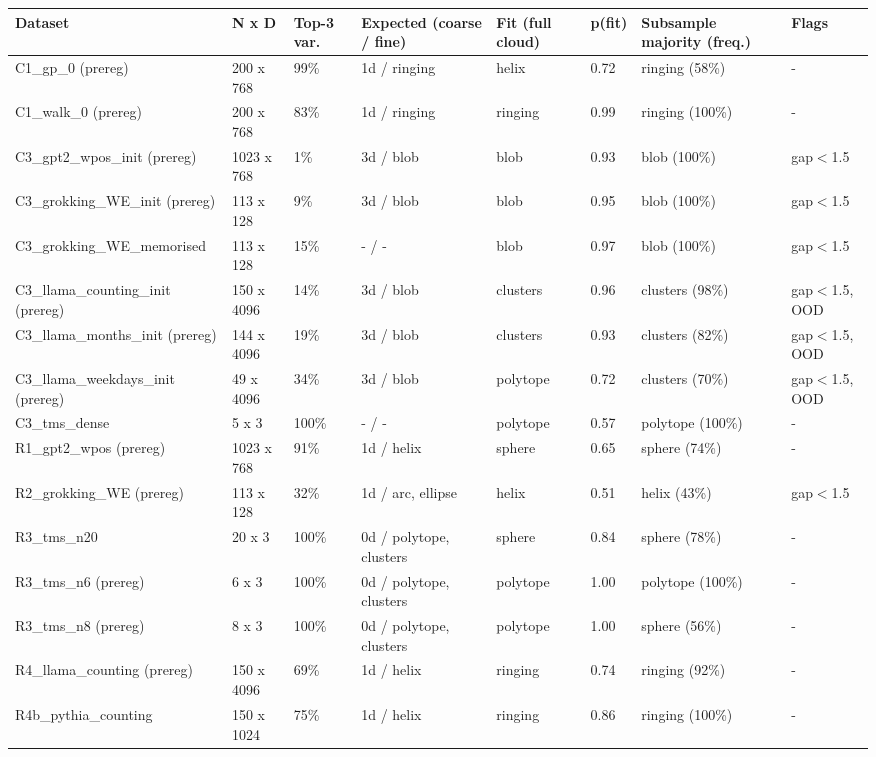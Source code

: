 \scriptsize
\begin{tabular}{llllllll}
\toprule
\textbf{Dataset} & \textbf{N x D} & \textbf{Top-3 var.} & \textbf{Expected (coarse / fine)} & \textbf{Fit (full cloud)} & \textbf{p(fit)} & \textbf{Subsample majority (freq.)} & \textbf{Flags} \\
\midrule
C1\_gp\_0 (prereg) & 200 x 768 & 99\% & 1d / ringing & helix & 0.72 & ringing (58\%) & - \\
C1\_walk\_0 (prereg) & 200 x 768 & 83\% & 1d / ringing & ringing & 0.99 & ringing (100\%) & - \\
C3\_gpt2\_wpos\_init (prereg) & 1023 x 768 & 1\% & 3d / blob & blob & 0.93 & blob (100\%) & gap$<$1.5 \\
C3\_grokking\_WE\_init (prereg) & 113 x 128 & 9\% & 3d / blob & blob & 0.95 & blob (100\%) & gap$<$1.5 \\
C3\_grokking\_WE\_memorised & 113 x 128 & 15\% & - / - & blob & 0.97 & blob (100\%) & gap$<$1.5 \\
C3\_llama\_counting\_init (prereg) & 150 x 4096 & 14\% & 3d / blob & clusters & 0.96 & clusters (98\%) & gap$<$1.5, OOD \\
C3\_llama\_months\_init (prereg) & 144 x 4096 & 19\% & 3d / blob & clusters & 0.93 & clusters (82\%) & gap$<$1.5, OOD \\
C3\_llama\_weekdays\_init (prereg) & 49 x 4096 & 34\% & 3d / blob & polytope & 0.72 & clusters (70\%) & gap$<$1.5, OOD \\
C3\_tms\_dense & 5 x 3 & 100\% & - / - & polytope & 0.57 & polytope (100\%) & - \\
R1\_gpt2\_wpos (prereg) & 1023 x 768 & 91\% & 1d / helix & sphere & 0.65 & sphere (74\%) & - \\
R2\_grokking\_WE (prereg) & 113 x 128 & 32\% & 1d / arc, ellipse & helix & 0.51 & helix (43\%) & gap$<$1.5 \\
R3\_tms\_n20 & 20 x 3 & 100\% & 0d / polytope, clusters & sphere & 0.84 & sphere (78\%) & - \\
R3\_tms\_n6 (prereg) & 6 x 3 & 100\% & 0d / polytope, clusters & polytope & 1.00 & polytope (100\%) & - \\
R3\_tms\_n8 (prereg) & 8 x 3 & 100\% & 0d / polytope, clusters & polytope & 1.00 & sphere (56\%) & - \\
R4\_llama\_counting (prereg) & 150 x 4096 & 69\% & 1d / helix & ringing & 0.74 & ringing (92\%) & - \\
R4b\_pythia\_counting & 150 x 1024 & 75\% & 1d / helix & ringing & 0.86 & ringing (100\%) & - \\

\end{tabular}
